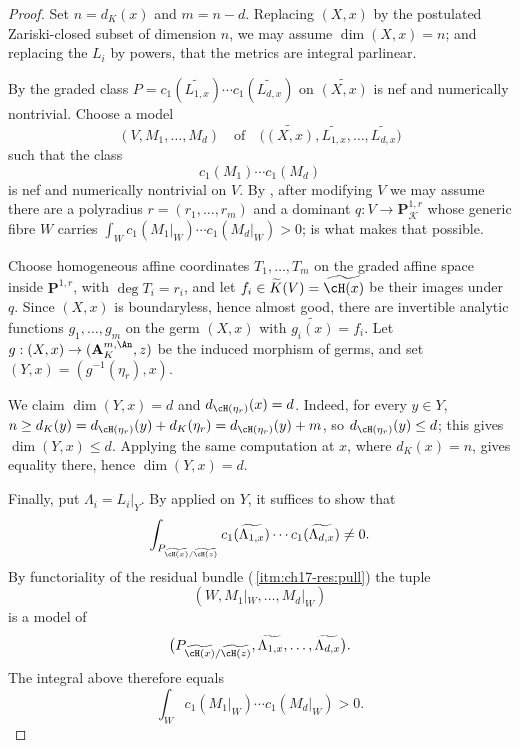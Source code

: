 \begin{proof}
Set $n=d_K(x)$ and $m=n-d$.  Replacing $(X,x)$ by the postulated
Zariski-closed subset of dimension $n$, we may assume
$\dim(X,x)=n$; and replacing the $L_i$ by powers, that the metrics are
integral parlinear.

By  the graded class
$P=c_1(\widetilde{L_{1,x}})\cdots c_1(\widetilde{L_{d,x}})$ on
$\widetilde{(X,x)}$ is nef and numerically nontrivial.  Choose a model
\[
 (V,M_1,\dots,M_d)
 \quad\text{of}\quad
 \bigl(\widetilde{(X,x)},\widetilde{L_{1,x}},\dots,
       \widetilde{L_{d,x}}\bigr)
\]
such that the class
\[
 c_1(M_1)\cdots c_1(M_d)
\]
is nef and numerically nontrivial on $V$.  By
, after
modifying $V$ we may assume there are a polyradius
$r=(r_1,\dots,r_m)$ and a dominant
$q:V\to\mathbf P^{1,r}_{\mathcal K}$ whose generic fibre $W$ carries
$\int_Wc_1(M_1|_W)\cdots c_1(M_d|_W)>0$; 
is what makes that possible.

Choose homogeneous affine coordinates $T_1,\dots,T_m$ on the graded affine
space inside $\mathbf P^{1,r}$, with $\deg T_i=r_i$, and let
$f_i\in\widetilde K(V)=\widetilde{\cH(x)}$ be their images under $q$.
Since $(X,x)$ is boundaryless, hence almost good, there are invertible
analytic functions $g_1,\dots,g_m$ on the germ $(X,x)$ with
$\widetilde{g_i(x)}=f_i$.  Let $g:(X,x)\to(\mathbf A^{m,\An}_K,z)$ be
the induced morphism of germs, and set $(Y,x)=(g^{-1}(\eta_r),x)$.

We claim $\dim(Y,x)=d$ and $d_{\cH(\eta_r)}(x)=d$.  Indeed, for every
$y\in Y$,
$n\ge d_K(y)=d_{\cH(\eta_r)}(y)+d_K(\eta_r)=d_{\cH(\eta_r)}(y)+m$, so
$d_{\cH(\eta_r)}(y)\le d$; this gives $\dim(Y,x)\le d$.  Applying the
same computation at $x$, where $d_K(x)=n$, gives equality there, hence
$\dim(Y,x)=d$.

Finally, put $\Lambda_i=L_i|_Y$.  By
 applied on $Y$, it suffices to show that
\[
 \int_{P_{\widetilde{\cH(x)}/\widetilde{\cH(z)}}}
 c_1(\widetilde{\Lambda_{1,x}})\cdots
 c_1(\widetilde{\Lambda_{d,x}})\ne0.
\]
By functoriality of the residual bundle
(\,\cref{itm:ch17-res:pull}) the tuple
\[
 (W,M_1|_W,\dots,M_d|_W)
\]
is a model of
\[
 \bigl(P_{\widetilde{\cH(x)}/\widetilde{\cH(z)}},
       \widetilde{\Lambda_{1,x}},\dots,
       \widetilde{\Lambda_{d,x}}\bigr).
\]
The integral above therefore equals
\[
 \int_Wc_1(M_1|_W)\cdots c_1(M_d|_W)>0.
\]
\end{proof}

